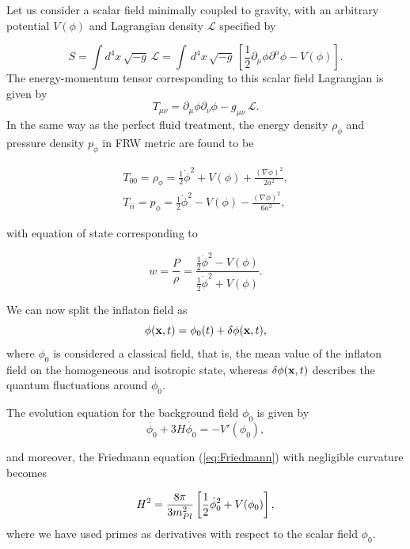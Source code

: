 \documentclass{rmaa}
\def\beq{\begin{equation}}
\def\eeq{\end{equation}}
\begin{document}
Let us consider a scalar field minimally coupled to gravity, with an arbitrary
potential $V(\phi)$ and Lagrangian density $\mathcal{L}$ specified by 


\begin{equation}
S=\int d^4x\, \sqrt{-g}\,\mathcal{L}=\int\, d^4x\, \sqrt{-g}\,
\left[\frac{1}{2}
\partial_{\mu}\phi
\partial^{\mu}\phi -V(\phi)\right].
\end{equation}
%
%
The energy-momentum tensor corresponding to this scalar field Lagrangian is given by
\beq
T_{\mu\nu}=\partial_{\mu}\phi \partial_{\nu}\phi
-g_{\mu\nu}\, \mathcal{L}.
\eeq
%
In the same way as the perfect fluid treatment, the 
energy density $\rho_\phi$ and pressure density $p_\phi$ in FRW metric are found to be 

\begin{eqnarray}
T_{00}=\rho_{\phi}=\frac{1}{2}\dot{\phi}^2 + V(\phi)+ 
\frac{(\nabla \phi)^2}{2a^2},  \\
T_{ii}=p_{\phi}=\frac{1}{2}\dot{\phi}^2 - V(\phi)- \frac{(\nabla
\phi)^2}{6a^2},
\end{eqnarray}

\noindent
with equation of state corresponding to
 
\begin{equation}
w = \frac{P}{\rho}=\frac{\frac{1}{2}\dot \phi^2-V(\phi)}{\frac{1}{2}\dot \phi^2+V(\phi)}.
\end{equation}

\noindent
We can now split the inflaton field as
\beq \label{eq:split}
\phi({\bf x},t)=\phi_{0}(t)+\delta\phi({\bf x},t),
\eeq
where $\phi_{0}$ is considered a classical field, that is, 
the mean value of the inflaton field on the homogeneous and isotropic state, 
whereas $\delta\phi({\bf x},t)$ describes the quantum fluctuations around $\phi_{0}$.

\noindent
The evolution equation for the background field $\phi_0$  is given by
\begin{equation}
\ddot{\phi_0}+ 3H\dot{\phi_0}= -V'(\phi_0),
\label{eq:motion1}
\end{equation}

\noindent
and moreover, the Friedmann equation (\ref{eq:Friedmann}) with negligible curvature becomes

\beq \label{eq:motion2}
H^2 = \frac{8\pi}{3m^2_{Pl}} \left[{1 \over 2} \dot\phi_0^2 +V(\phi_0)\right],
\eeq
where we have used 
primes as derivatives with respect to the scalar field $\phi_0$. 
\\
\end{document}
